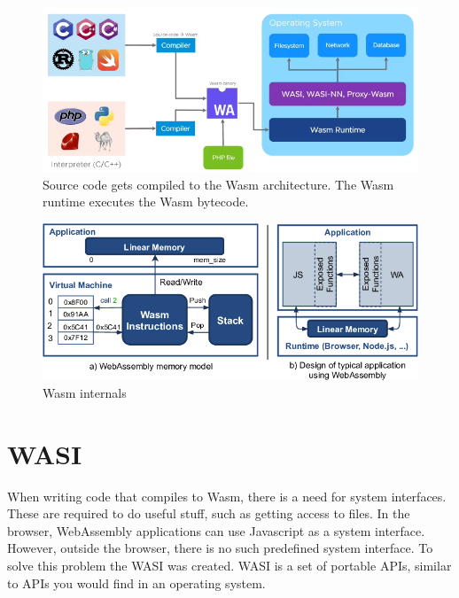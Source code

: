 \begin{figure}[H]
  \centering
  \includegraphics[width=1\textwidth]{images/wasm_compiler.png}
  \caption{Source code gets compiled to the Wasm architecture. The Wasm runtime executes the Wasm bytecode. \cite{docker_without_containers}}
  \label{fig:wasm_compiler_frontend}
\end{figure}

\begin{figure}[H]
  \centering
  \includegraphics[width=1\textwidth]{images/WebAssembly-high-level-architecture.png}
  \caption{Wasm internals \cite{wasm_vulnerabilities}}
  \label{fig:wasm_high_level}
\end{figure}

\section{\acrshort{WASI}}

When writing code that compiles to Wasm, there is a need for system interfaces. These are required to do useful stuff, such as getting access to files. In the browser, WebAssembly applications can use Javascript as a system interface. However, outside the browser, there is no such predefined system interface. To solve this problem the \acrfull{WASI} was created. \acrshort{WASI} is a set of portable APIs, similar to APIs you would find in an operating system.

